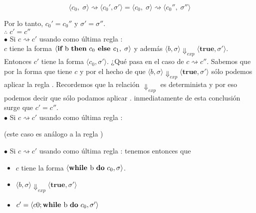 \documentclass[11pt, fleqn]{article}
\begin{document}
\begin{equation*}
 \langle c_0, \; \sigma \rangle \rightsquigarrow \langle c_0', \sigma' \rangle = \langle c_0, \; \sigma \rangle \rightsquigarrow \langle c_0'', \; \sigma'' \rangle
\end{equation*}

Por lo tanto, $c_0' = c_0''$ y $\sigma' = \sigma''$. \\

$\therefore \; c' = c''$ \\


$\bullet$ Si $ c \rightsquigarrow c' $ usando como última regla : \\
$c$ tiene la forma $ \langle \textbf{if } \text{b \textbf{then} } c_0 \textbf{ else } c_1, \; \sigma \rangle$
y además $ \langle b, \sigma \rangle \Downarrow_{exp} \langle \textbf{true}, \sigma' \rangle$.
Entonces $c'$ tiene la forma $ \langle c_0, \sigma' \rangle$. ¿Qué pasa en el caso
de  $ c \rightsquigarrow c'' $. Sabemos que por la forma que tiene $c$ y por el hecho de
que $ \langle b, \sigma \rangle \Downarrow_{exp} \langle \textbf{true}, \sigma' \rangle$
sólo podemos aplicar la regla . Recordemos que la relación $\Downarrow_{exp}$ es
determinista y por eso podemos decir que sólo podamos aplicar . inmediatamente
de esta conclusión surge que $c' = c''$. \\


$\bullet$ Si $ c \rightsquigarrow c' $ usando como última regla :
\begin{center}(este caso es análogo a la regla )\end{center}


$\bullet$ Si $ c \rightsquigarrow c' $ usando como última regla : tenemos entonces que
\begin{itemize}
      \item $c$ tiene la forma $ \langle \textbf{while } \text{b \textbf{do} } c_0, \sigma \rangle$.
      \item $ \langle b, \sigma \rangle \Downarrow_{exp} \langle \textbf{true}, \sigma' \rangle$
      \item $c' = \langle c0; \textbf{while } \text{b \textbf{do} } c_0, \sigma' \rangle$
\end{itemize}
\end{document}
